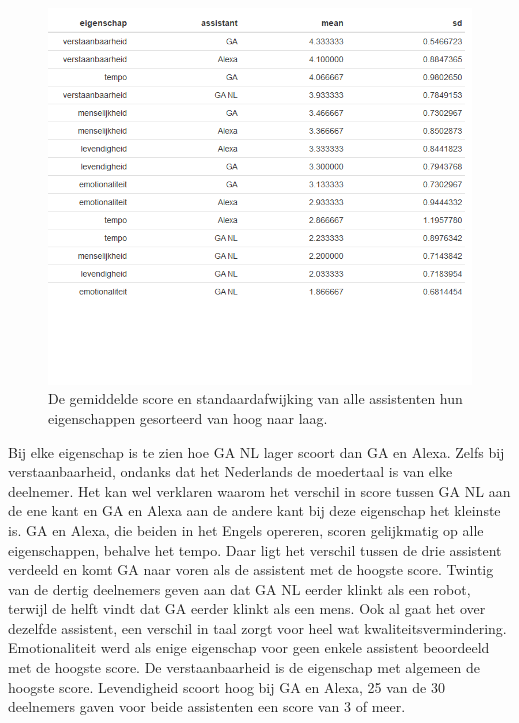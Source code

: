 \begin{figure}[H]
    \centering
    \includegraphics[width=0.9\linewidth]{../onderzoek/onderzoeksresultaten/vergelijking_assistenten_per_eigenschap/table_mean_sd_scores}
    \caption{De gemiddelde score en standaardafwijking van alle assistenten hun eigenschappen gesorteerd van hoog naar laag.}
    \label{fig:table-mean-sd-scores}
\end{figure}

Bij elke eigenschap is te zien hoe \gls{GA NL} lager scoort dan \gls{GA} en Alexa. Zelfs bij verstaanbaarheid, ondanks dat het Nederlands de moedertaal is van elke deelnemer. Het kan wel verklaren waarom het verschil in score tussen \gls{GA NL} aan de ene kant en \gls{GA} en Alexa aan de andere kant bij deze eigenschap het kleinste is. \gls{GA} en Alexa, die beiden in het Engels opereren, scoren gelijkmatig op alle eigenschappen, behalve het tempo. Daar ligt het verschil tussen de drie assistent verdeeld en komt \gls{GA} naar voren als de assistent met de hoogste score.
Twintig van de dertig deelnemers geven aan dat \gls{GA NL} eerder klinkt als een robot, terwijl de helft vindt dat \gls{GA} eerder klinkt als een mens. Ook al gaat het over dezelfde assistent, een verschil in taal zorgt voor heel wat kwaliteitsvermindering.
Emotionaliteit werd als enige eigenschap voor geen enkele assistent beoordeeld met de hoogste score. De verstaanbaarheid is de eigenschap met algemeen de hoogste score.
Levendigheid scoort hoog bij \gls{GA} en Alexa, 25 van de 30 deelnemers gaven voor beide assistenten een score van 3 of meer.

